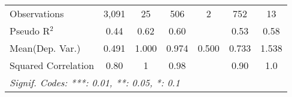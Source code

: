\begin{tabular}{lcccccc}
   Observations                                               & 3,091         & 25            & 506           & 2    & 752           & 13\\  
   Pseudo R$^2$                                               & 0.44          & 0.62          & 0.60          &      & 0.53          & 0.58\\  
Mean(Dep. Var.) & 0.491 & 1.000 & 0.974 & 0.500 & 0.733 & 1.538 \\
   Squared Correlation                                        & 0.80          & 1             & 0.98          &      & 0.90          & 1.0\\  
   \midrule \midrule
   \multicolumn{7}{l}{\emph{Signif. Codes: ***: 0.01, **: 0.05, *: 0.1}}\\
\end{tabular}
\par\endgroup
